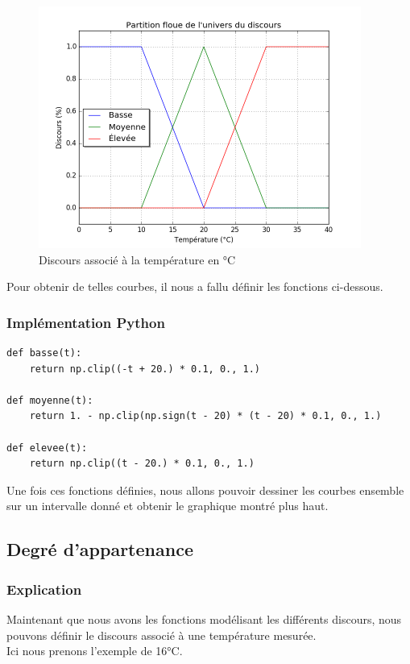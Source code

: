 \documentclass[a4paper]{article}
\begin{document}
\begin{figure}[h]
\begin{center}
	\includegraphics[width=400px]{plot_3.png}
\end{center}
\caption{Discours associé à la température en °C}
\end{figure}

Pour obtenir de telles courbes, il nous a fallu définir les fonctions ci-dessous.

\subsubsection{Implémentation Python}
\begin{lstlisting}
def basse(t):
    return np.clip((-t + 20.) * 0.1, 0., 1.)

def moyenne(t):
    return 1. - np.clip(np.sign(t - 20) * (t - 20) * 0.1, 0., 1.)

def elevee(t):
    return np.clip((t - 20.) * 0.1, 0., 1.)
\end{lstlisting}

Une fois ces fonctions définies, nous allons pouvoir dessiner les courbes ensemble sur un intervalle donné et obtenir le graphique montré plus haut.

\subsection{Degré d'appartenance}

\subsubsection{Explication}
Maintenant que nous avons les fonctions modélisant les différents discours, nous pouvons définir le discours associé à une température mesurée.\\
Ici nous prenons l'exemple de 16°C.
\end{document}
